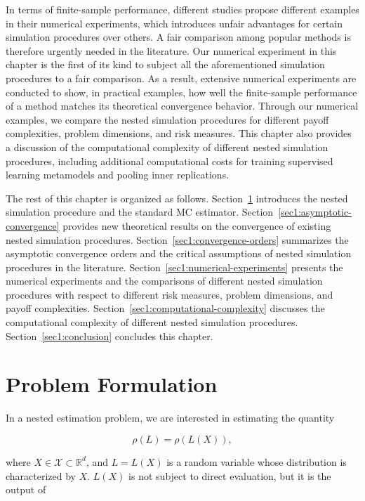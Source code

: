 In terms of finite-sample performance, different studies propose different examples in their numerical experiments, which introduces unfair advantages for certain simulation procedures over others. 
A fair comparison among popular methods is therefore urgently needed in the literature. 
Our numerical experiment in this chapter is the first of its kind to subject all the aforementioned simulation procedures to a fair comparison. 
As a result, extensive numerical experiments are conducted to show, in practical examples, how well the finite-sample performance of a method matches its theoretical convergence behavior. 
Through our numerical examples, we compare the nested simulation procedures for different payoff complexities, problem dimensions, and risk measures. 
This chapter also provides a discussion of the computational complexity of different nested simulation procedures, including additional computational costs for training supervised learning metamodels and pooling inner replications.

The rest of this chapter is organized as follows.
Section~\ref{sec1:problem-formulation} introduces the nested simulation procedure and the standard MC estimator.
Section~\ref{sec1:asymptotic-convergence} provides new theoretical results on the convergence of existing nested simulation procedures.
Section~\ref{sec1:convergence-orders} summarizes the asymptotic convergence orders and the critical assumptions of nested simulation procedures in the literature.
Section~\ref{sec1:numerical-experiments} presents the numerical experiments and the comparisons of different nested simulation procedures with respect to different risk measures, problem dimensions, and payoff complexities.
Section~\ref{sec1:computational-complexity} discusses the computational complexity of different nested simulation procedures.
Section~\ref{sec1:conclusion} concludes this chapter.

\section{Problem Formulation} \label{sec1:problem-formulation}

In a nested estimation problem, we are interested in estimating the quantity 

$$\rho(L) = \rho(L(X)),$$

where $X \in \mathcal{X} \subset \mathbb{R}^d$, and $L = L(X)$ is a random variable whose distribution is characterized by $X$.
$L(X)$ is not subject to direct evaluation, but it is the output of 

